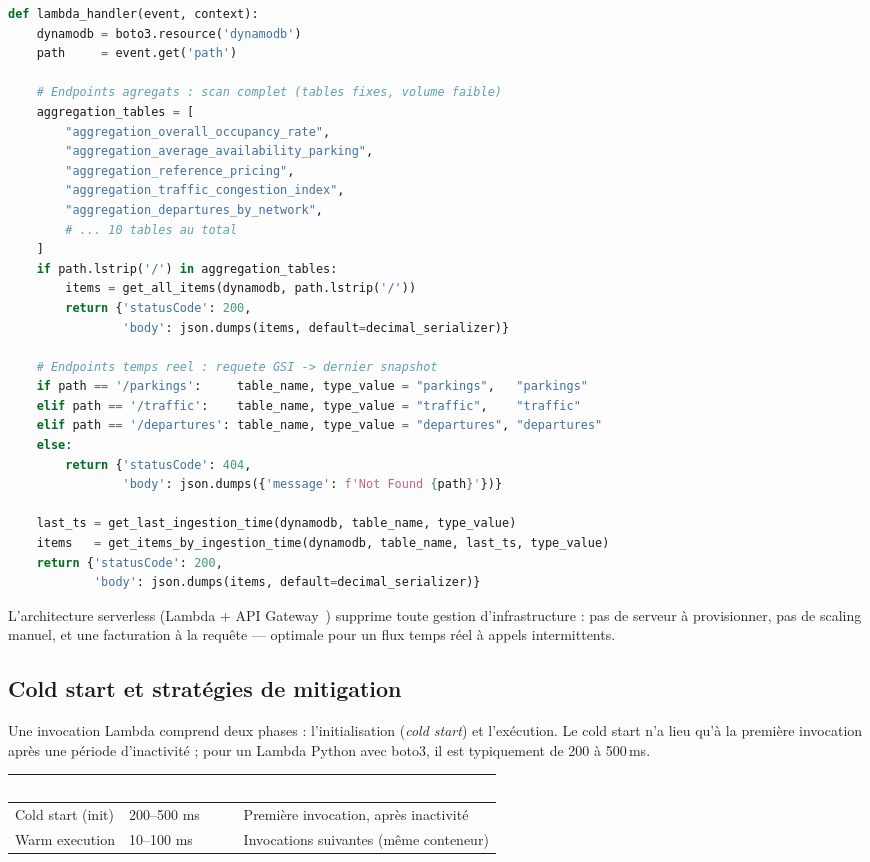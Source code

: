 \documentclass[11pt]{article}
\newcommand{\thead}[1]{\textbf{\textcolor{white}{#1}}}
\begin{document}
\begin{lstlisting}[language=Python, caption=Lambda handler -- routage des 13 endpoints (api/main.py)]
def lambda_handler(event, context):
    dynamodb = boto3.resource('dynamodb')
    path     = event.get('path')

    # Endpoints agregats : scan complet (tables fixes, volume faible)
    aggregation_tables = [
        "aggregation_overall_occupancy_rate",
        "aggregation_average_availability_parking",
        "aggregation_reference_pricing",
        "aggregation_traffic_congestion_index",
        "aggregation_departures_by_network",
        # ... 10 tables au total
    ]
    if path.lstrip('/') in aggregation_tables:
        items = get_all_items(dynamodb, path.lstrip('/'))
        return {'statusCode': 200,
                'body': json.dumps(items, default=decimal_serializer)}

    # Endpoints temps reel : requete GSI -> dernier snapshot
    if path == '/parkings':     table_name, type_value = "parkings",   "parkings"
    elif path == '/traffic':    table_name, type_value = "traffic",    "traffic"
    elif path == '/departures': table_name, type_value = "departures", "departures"
    else:
        return {'statusCode': 404,
                'body': json.dumps({'message': f'Not Found {path}'})}

    last_ts = get_last_ingestion_time(dynamodb, table_name, type_value)
    items   = get_items_by_ingestion_time(dynamodb, table_name, last_ts, type_value)
    return {'statusCode': 200,
            'body': json.dumps(items, default=decimal_serializer)}
\end{lstlisting}

L'architecture serverless (Lambda + API Gateway~\cite{apigateway}) supprime toute
gestion d'infrastructure : pas de serveur à provisionner, pas de scaling manuel, et
une facturation à la requête --- optimale pour un flux temps  réel à appels
intermittents.

\subsection{Cold start et stratégies de mitigation}

Une invocation Lambda comprend deux phases : l'initialisation (\textit{cold start})
et l'exécution. Le cold start n'a lieu qu'à la première invocation après une période
d'inactivité ; pour un Lambda Python avec boto3, il est typiquement de 200 à 500\,ms.

\begin{center}\begin{tabularx}{\linewidth}{|l|l|>{\raggedright\arraybackslash}X|}
\hline
\rowcolor{tableHeader}
\thead{Phase} & \thead{Durée typique} & \thead{Fréquence} \\
\hline
Cold start (init) & 200--500 ms & Première invocation, après inactivité \\
\hline
Warm execution & 10--100 ms & Invocations suivantes (même conteneur) \\
\hline
\end{tabularx}\end{center}
\end{document}
